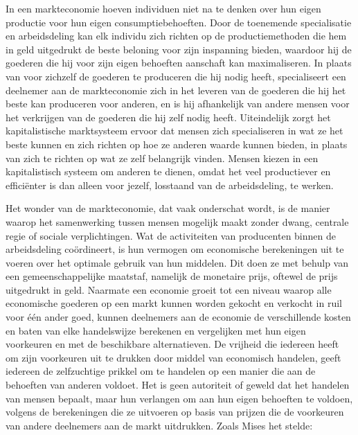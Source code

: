 In een markteconomie hoeven individuen niet na te denken over hun eigen productie voor hun eigen consumptiebehoeften. Door de toenemende specialisatie en arbeidsdeling kan elk individu zich richten op de productiemethoden die hem in geld uitgedrukt de beste beloning voor zijn inspanning bieden, waardoor hij de goederen die hij voor zijn eigen behoeften aanschaft kan maximaliseren. In plaats van voor zichzelf de goederen te produceren die hij nodig heeft, specialiseert een deelnemer aan de markteconomie zich in het leveren van de goederen die hij het beste kan produceren voor anderen, en is hij afhankelijk van andere mensen voor het verkrijgen van de goederen die hij zelf nodig heeft. Uiteindelijk zorgt het kapitalistische marktsysteem ervoor dat mensen zich specialiseren in wat ze het beste kunnen en zich richten op hoe ze anderen waarde kunnen bieden, in plaats van zich te richten op wat ze zelf belangrijk vinden. Mensen kiezen in een kapitalistisch systeem om anderen te dienen, omdat het veel productiever en efficiënter is dan alleen voor jezelf, losstaand van de arbeidsdeling, te werken.

Het wonder van de markteconomie, dat vaak onderschat wordt, is de manier waarop het samenwerking tussen mensen mogelijk maakt zonder dwang, centrale regie of sociale verplichtingen. Wat de activiteiten van producenten binnen de arbeidsdeling coördineert, is hun vermogen om economische berekeningen uit te voeren over het optimale gebruik van hun middelen. Dit doen ze met behulp van een gemeenschappelijke maatstaf, namelijk de monetaire prijs, oftewel de prijs uitgedrukt in geld. Naarmate een economie groeit tot een niveau waarop alle economische goederen op een markt kunnen worden gekocht en verkocht in ruil voor één ander goed, kunnen deelnemers aan de economie de verschillende kosten en baten van elke handelswijze berekenen en vergelijken met hun eigen voorkeuren en met de beschikbare alternatieven. De vrijheid die iedereen heeft om zijn voorkeuren uit te drukken door middel van economisch handelen, geeft iedereen de zelfzuchtige prikkel om te handelen op een manier die aan de behoeften van anderen voldoet. Het is geen autoriteit of geweld dat het handelen van mensen bepaalt, maar hun verlangen om aan hun eigen behoeften te voldoen, volgens de berekeningen die ze uitvoeren op basis van prijzen die de voorkeuren van andere deelnemers aan de markt uitdrukken. Zoals Mises het stelde:

